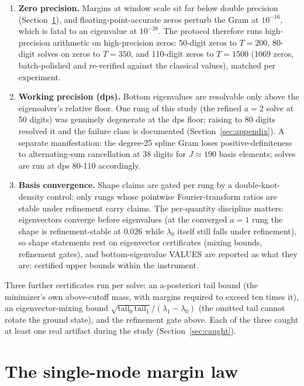\documentclass[10pt]{article}
\begin{document}
\begin{enumerate}
\item \textbf{Zero precision.} Margins at window scale sit far below double precision (Section~\ref{sec:margin}), and floating-point-accurate zeros perturb the Gram at $10^{-16}$, which is fatal to an eigenvalue at $10^{-38}$. The protocol therefore runs high-precision arithmetic on high-precision zeros: 50-digit zeros to $T = 200$, 80-digit solves on zeros to $T = 350$, and 110-digit zeros to $T = 1500$ (1069 zeros, batch-polished and re-verified against the classical values), matched per experiment.
\item \textbf{Working precision (dps).} Bottom eigenvalues are resolvable only above the eigensolver's relative floor. One rung of this study (the refined $a = 2$ solve at 50 digits) was genuinely degenerate at the dps floor; raising to 80 digits resolved it and the failure class is documented (Section~\ref{sec:appendix}). A separate manifestation: the degree-25 spline Gram loses positive-definiteness to alternating-sum cancellation at 38 digits for $J \approx 190$ basis elements; solves are run at dps 80-110 accordingly.
\item \textbf{Basis convergence.} Shape claims are gated per rung by a double-knot-density control: only rungs whose pointwise Fourier-transform ratios are stable under refinement carry claims. The per-quantity discipline matters: eigenvectors converge before eigenvalues (at the converged $a = 1$ rung the shape is refinement-stable at $0.026$ while $\lambda_0$ itself still falls under refinement), so shape statements rest on eigenvector certificates (mixing bounds, refinement gates), and bottom-eigenvalue VALUES are reported as what they are: certified upper bounds within the instrument.
\end{enumerate}

Three further certificates run per solve: an a-posteriori tail bound (the minimizer's own above-cutoff mass, with margins required to exceed ten times it), an eigenvector-mixing bound $\sqrt{\mathrm{tail}_0\,\mathrm{tail}_1}/(\lambda_1 - \lambda_0)$ (the omitted tail cannot rotate the ground state), and the refinement gate above. Each of the three caught at least one real artifact during the study (Section~\ref{sec:caught}).

\section{The single-mode margin law}\label{sec:margin}
\end{document}
